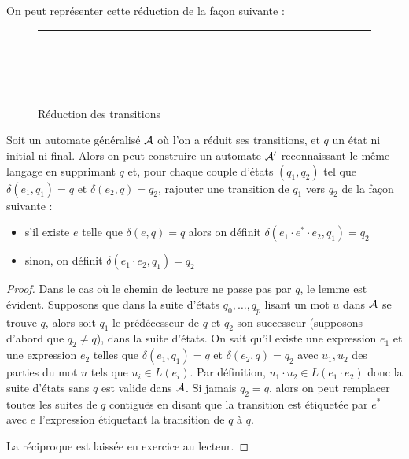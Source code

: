On peut représenter cette réduction de la façon suivante :

\begin{figure}[htb]
    \centering
    \rule{17cm}{0.5pt}\\
    \vspace{0.5cm}
    \rule{17cm}{0.5pt}\\
    \vspace{0.5cm}
    \caption{Réduction des transitions}
\end{figure}

\begin{lem}
    Soit un automate généralisé $\mathcal A$ où l'on a réduit ses transitions, et $q$ un état ni initial ni final. Alors on peut construire un automate $\mathcal A'$ reconnaissant le même langage en supprimant $q$ et, pour chaque couple d'états $(q_1,q_2)$ tel que $\delta(e_1,q_1)=q$ et $\delta(e_2,q)=q_2$, rajouter une transition de $q_1$ vers $q_2$ de la façon suivante :
    \begin{itemize}[label=$\bullet$]
        \item s'il existe $e$ telle que $\delta(e,q)=q$ alors on définit $\delta(e_1\cdot e^* \cdot e_2,q_1)=q_2$
        \item sinon, on définit $\delta(e_1\cdot e_2,q_1)=q_2$
    \end{itemize}
\end{lem}

\begin{proof}
    Dans le cas où le chemin de lecture ne passe pas par $q$, le lemme est évident. Supposons que dans la suite d'états $q_0,\ldots,q_p$ lisant un mot $u$ dans $\mathcal A$ se trouve $q$, alors soit $q_1$ le prédécesseur de $q$ et $q_2$ son successeur (supposons d'abord que $q_2 \neq q$), dans la suite d'états. On sait qu'il existe une expression $e_1$ et une expression $e_2$ telles que $\delta(e_1,q_1)=q$ et $\delta(e_2,q)=q_2$ avec $u_1,u_2$ des parties du mot $u$ tels que $u_i\in L(e_i)$. Par définition, $u_1\cdot u_2\in L(e_1\cdot e_2)$ donc la suite d'états sans $q$ est valide dans $\mathcal A$. Si jamais $q_2=q$, alors on peut remplacer toutes les suites de $q$ contiguës en disant que la transition est étiquetée par $e^*$ avec $e$ l'expression étiquetant la transition de $q$ à $q$.

    La réciproque est laissée en exercice au lecteur.
\end{proof}

